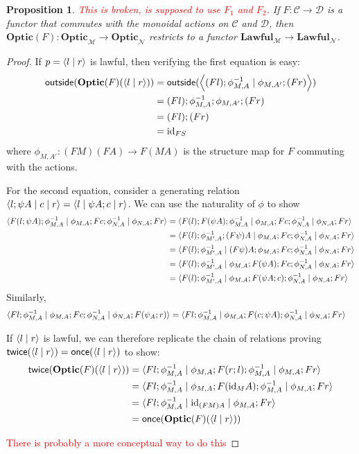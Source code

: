 \documentclass[11pt,a4paper]{article}
\theoremstyle{plain}
\newtheorem{proposition}[theorem]{Proposition}
\theoremstyle{definition}
\newcommand{\C}{\mathscr{C}}
\newcommand{\D}{\mathscr{D}}
\newcommand{\M}{\mathscr{M}}
\newcommand{\N}{\mathscr{N}}
\newcommand{\Optic}{\mathbf{Optic}}
\newcommand{\Lawful}{\mathbf{Lawful}}
\newcommand{\id}{\mathrm{id}}
\newcommand{\rep}[2]{{\ensuremath \left\langle #1 \mid #2 \right\rangle}}
\newcommand{\repthree}[3]{{\ensuremath \langle #1 \mid #2 \mid #3 \rangle}}
\newcommand{\outside}{\mathsf{outside}}
\newcommand{\once}{\mathsf{once}}
\newcommand{\twice}{\mathsf{twice}}
\newcommand{\todo}[1]{\textcolor{red}{\small #1}}
\begin{document}
\begin{proposition} \todo{This is broken, is supposed to use $F_1$ and $F_2$.}
  If $F : \C \to \D$ is a functor that commutes with the monoidal actions on $\C$ and $\D$, then $\Optic(F) : \Optic_\M \to \Optic_\N$ restricts to a functor $\Lawful_\M \to \Lawful_\N$.
\end{proposition}
\begin{proof}
  If $p = \rep{l}{r}$ is lawful, then verifying the first equation is easy:
  \begin{align*}
  \outside(\Optic(F)(\rep{l}{r})) 
  &= \outside(\rep{(Fl);\phi^{-1}_{M,A} }{\phi_{M,A'};(Fr) }) \\
  &= (Fl);\phi^{-1}_{M,A};\phi_{M,A'};(Fr)\\
  &= (Fl);(Fr)\\
  &= \id_{FS}
  \end{align*}
  where $\phi_{M,A'} : (FM)(FA) \to F(MA)$ is the structure map for $F$ commuting with the actions.
  
  For the second equation, consider a generating relation $\repthree{l;\psi A}{c}{r} = \repthree{l}{\psi A ; c}{r}$. We can use the naturality of $\phi$ to show
  \begin{align*}
  \repthree{F(l;\psi A);\phi^{-1}_{M,A}}{\phi_{M,A};Fc;\phi^{-1}_{N,A}}{\phi_{N,A};Fr} 
  &= \repthree{F(l);F(\psi A);\phi^{-1}_{M,A}}{\phi_{M,A};Fc;\phi^{-1}_{N,A}}{\phi_{N,A};Fr} \\
  &= \repthree{F(l);\phi^{-1}_{M',A};(F\psi) A}{\phi_{M,A};Fc;\phi^{-1}_{N,A}}{\phi_{N,A};Fr} \\
  &= \repthree{F(l);\phi^{-1}_{M',A}}{(F\psi) A;\phi_{M,A};Fc;\phi^{-1}_{N,A}}{\phi_{N,A};Fr} \\
  &= \repthree{F(l);\phi^{-1}_{M',A}}{\phi_{M,A};F(\psi A);Fc;\phi^{-1}_{N,A}}{\phi_{N,A};Fr} \\
  &= \repthree{F(l);\phi^{-1}_{M',A}}{\phi_{M,A};F(\psi A;c);\phi^{-1}_{N,A}}{\phi_{N,A};Fr} \\
  \end{align*}
  Similarly, 
  \begin{align*}
    \repthree{Fl;\phi^{-1}_{M,A}}{\phi_{M,A};Fc;\phi^{-1}_{N,A}}{\phi_{N,A};F(\psi_A;r)} 
    &= \repthree{Fl;\phi^{-1}_{M,A}}{\phi_{M,A};F(c;\psi A);\phi^{-1}_{N,A}}{\phi_{N,A};Fr} 
  \end{align*}

  If $\rep{l}{r}$ is lawful, we can therefore replicate the chain of relations proving $\twice(\rep{l}{r}) = \once(\rep{l}{r})$ to show:
  \begin{align*}
  \twice(\Optic(F)(\rep{l}{r})) 
  &= \repthree{Fl;\phi^{-1}_{M,A}}{\phi_{M,A};F(r;l);\phi^{-1}_{M,A}}{\phi_{M,A};Fr}  \\
  &= \repthree{Fl;\phi^{-1}_{M,A}}{\phi_{M,A};F(\id_MA);\phi^{-1}_{M,A}}{\phi_{M,A};Fr}  \\
  &= \repthree{Fl;\phi^{-1}_{M,A}}{\id_{(FM)A}}{\phi_{M,A};Fr}  \\
  &= \once(\Optic(F)(\rep{l}{r})) 
  \end{align*}
  
  \todo{There is probably a more conceptual way to do this}
\end{proof}
\end{document}
